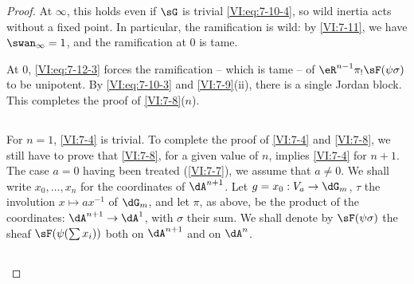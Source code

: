 \documentclass[oneside]{book}
\begin{document}
\begin{proof}[Proof]
At $\infty$, this holds even if $\sG$ is trivial \eqref{VI:eq:7-10-4}, 
so wild inertia acts without a fixed point. In particular, the 
ramification is wild: by \ref{VI:7-11}, we have $\swan_\infty=1$, and the 
ramification at $0$ is tame. 

At $0$, \eqref{VI:eq:7-12-3} forces the ramification -- which is tame -- of 
$\eR^{n-1} \pi_! \sF(\psi\sigma)$ to be unipotent. By 
\eqref{VI:eq:7-10-3} and \ref{VI:7-9}(ii), there is a single Jordan block. This 
completes the proof of \ref{VI:7-8}($n$). 





\subsection{}\label{VI:7-13}

For $n=1$, \ref{VI:7-4} is trivial. To complete the proof of \ref{VI:7-4} and 
\ref{VI:7-8}, we still have to prove that \ref{VI:7-8}, for a given value 
of $n$, implies \ref{VI:7-4} for $n+1$. The case $a=0$ having been 
  treated (\ref{VI:7-7}), we assume that $a\ne 0$. We shall write $x_0,\dots,x_n$ for 
the coordinates of $\dA^{n+1}$. Let $g=x_0:V_a\to \dG_m$, $\tau$ 
the involution $x\mapsto a x^{-1}$ of $\dG_m$, and let $\pi$, as above, be the 
product of the coordinates: $\dA^{n+1} \to \dA^1$, with $\sigma$ their sum. We 
shall denote by $\sF(\psi\sigma)$ the sheaf $\sF(\psi(\sum x_i))$ both on $\dA^{n+1}$ 
and on $\dA^n$. 





\subsection{}\label{VI:7-14}


\end{proof}
\end{document}
